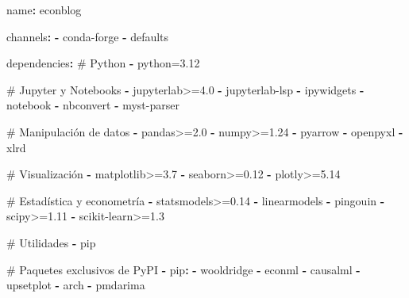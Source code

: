 \documentclass[
  doc,
  floatsintext,
  longtable,
  a4paper,
  nolmodern,
  notxfonts,
  notimes,
  12pt,
  colorlinks=true,linkcolor=blue,citecolor=blue,urlcolor=blue]{apa7}
\newenvironment{Shaded}{\begin{snugshade}}{\end{snugshade}}
\newcommand{\AttributeTok}[1]{\textcolor[rgb]{0.40,0.45,0.13}{#1}}
\newcommand{\CommentTok}[1]{\textcolor[rgb]{0.37,0.37,0.37}{#1}}
\newcommand{\FunctionTok}[1]{\textcolor[rgb]{0.28,0.35,0.67}{#1}}
\newcommand{\KeywordTok}[1]{\textcolor[rgb]{0.00,0.23,0.31}{\textbf{#1}}}
\begin{document}
\begin{Shaded}
\begin{Highlighting}[]
\FunctionTok{name}\KeywordTok{:}\AttributeTok{ econblog}

\FunctionTok{channels}\KeywordTok{:}
\AttributeTok{  }\KeywordTok{{-}}\AttributeTok{ conda{-}forge}
\AttributeTok{  }\KeywordTok{{-}}\AttributeTok{ defaults}

\FunctionTok{dependencies}\KeywordTok{:}
\CommentTok{  \# Python}
\AttributeTok{  }\KeywordTok{{-}}\AttributeTok{ python=3.12}

\CommentTok{  \# Jupyter y Notebooks}
\AttributeTok{  }\KeywordTok{{-}}\AttributeTok{ jupyterlab\textgreater{}=4.0}
\AttributeTok{  }\KeywordTok{{-}}\AttributeTok{ jupyterlab{-}lsp}
\AttributeTok{  }\KeywordTok{{-}}\AttributeTok{ ipywidgets}
\AttributeTok{  }\KeywordTok{{-}}\AttributeTok{ notebook}
\AttributeTok{  }\KeywordTok{{-}}\AttributeTok{ nbconvert}
\AttributeTok{  }\KeywordTok{{-}}\AttributeTok{ myst{-}parser}

\CommentTok{  \# Manipulación de datos}
\AttributeTok{  }\KeywordTok{{-}}\AttributeTok{ pandas\textgreater{}=2.0}
\AttributeTok{  }\KeywordTok{{-}}\AttributeTok{ numpy\textgreater{}=1.24}
\AttributeTok{  }\KeywordTok{{-}}\AttributeTok{ pyarrow}
\AttributeTok{  }\KeywordTok{{-}}\AttributeTok{ openpyxl}
\AttributeTok{  }\KeywordTok{{-}}\AttributeTok{ xlrd}

\CommentTok{  \# Visualización}
\AttributeTok{  }\KeywordTok{{-}}\AttributeTok{ matplotlib\textgreater{}=3.7}
\AttributeTok{  }\KeywordTok{{-}}\AttributeTok{ seaborn\textgreater{}=0.12}
\AttributeTok{  }\KeywordTok{{-}}\AttributeTok{ plotly\textgreater{}=5.14}

\CommentTok{  \# Estadística y econometría}
\AttributeTok{  }\KeywordTok{{-}}\AttributeTok{ statsmodels\textgreater{}=0.14}
\AttributeTok{  }\KeywordTok{{-}}\AttributeTok{ linearmodels}
\AttributeTok{  }\KeywordTok{{-}}\AttributeTok{ pingouin}
\AttributeTok{  }\KeywordTok{{-}}\AttributeTok{ scipy\textgreater{}=1.11}
\AttributeTok{  }\KeywordTok{{-}}\AttributeTok{ scikit{-}learn\textgreater{}=1.3}

\CommentTok{  \# Utilidades}
\AttributeTok{  }\KeywordTok{{-}}\AttributeTok{ pip}

\CommentTok{  \# Paquetes exclusivos de PyPI}
\AttributeTok{  }\KeywordTok{{-}}\AttributeTok{ }\FunctionTok{pip}\KeywordTok{:}
\AttributeTok{    }\KeywordTok{{-}}\AttributeTok{ wooldridge}
\AttributeTok{    }\KeywordTok{{-}}\AttributeTok{ econml}
\AttributeTok{    }\KeywordTok{{-}}\AttributeTok{ causalml}
\AttributeTok{    }\KeywordTok{{-}}\AttributeTok{ upsetplot}
\AttributeTok{    }\KeywordTok{{-}}\AttributeTok{ arch}
\AttributeTok{    }\KeywordTok{{-}}\AttributeTok{ pmdarima}
\end{Highlighting}
\end{Shaded}
\end{document}
